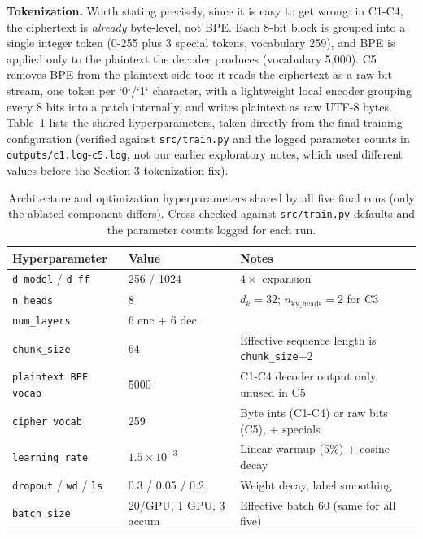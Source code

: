 \documentclass[12pt,a4paper]{article}
\begin{document}
\textbf{Tokenization.} Worth stating precisely, since it is easy to get wrong: in C1-C4, the ciphertext is \emph{already} byte-level, not BPE. Each 8-bit block is grouped into a single integer token (0-255 plus 3 special tokens, vocabulary 259), and BPE is applied only to the plaintext the decoder produces (vocabulary 5,000). C5 removes BPE from the plaintext side too: it reads the ciphertext as a raw bit stream, one token per `0`/`1` character, with a lightweight local encoder grouping every 8 bits into a patch internally, and writes plaintext as raw UTF-8 bytes. Table~\ref{tab:hparams} lists the shared hyperparameters, taken directly from the final training configuration (verified against \texttt{src/train.py} and the logged parameter counts in \texttt{outputs/c1.log}-\texttt{c5.log}, not our earlier exploratory notes, which used different values before the Section 3 tokenization fix).

\begin{table}[H]
\centering
\small
\begin{tabularx}{\linewidth}{llX}
\toprule
\textbf{Hyperparameter} & \textbf{Value} & \textbf{Notes} \\
\midrule
\texttt{d\_model} / \texttt{d\_ff} & 256 / 1024 & $4\times$ expansion \\
\texttt{n\_heads} & 8 & $d_k=32$; $n_{\text{kv\_heads}}=2$ for C3 \\
\texttt{num\_layers} & 6 enc + 6 dec & \\
\texttt{chunk\_size} & 64 & Effective sequence length is \texttt{chunk\_size}+2 \\
\texttt{plaintext BPE vocab} & 5000 & C1-C4 decoder output only, unused in C5 \\
\texttt{cipher vocab} & 259 & Byte ints (C1-C4) or raw bits (C5), + specials \\
\texttt{learning\_rate} & $1.5\times10^{-3}$ & Linear warmup (5\%) + cosine decay \\
\texttt{dropout} / \texttt{wd} / \texttt{ls} & 0.3 / 0.05 / 0.2 & Weight decay, label smoothing \\
\texttt{batch\_size} & 20/GPU, 1 GPU, 3 accum & Effective batch 60 (same for all five) \\
\bottomrule
\end{tabularx}
\caption{Architecture and optimization hyperparameters shared by all five final runs (only the ablated component differs). Cross-checked against \texttt{src/train.py} defaults and the parameter counts logged for each run.}
\label{tab:hparams}
\end{table}
\end{document}
